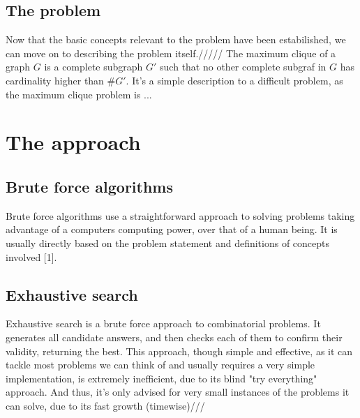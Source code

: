 \documentclass[...]{revdetua}
\begin{document}
\subsection{The problem}
Now that the basic concepts relevant to the problem have been estabilished, we can move on to describing the problem itself./////
The maximum clique of a graph $G$ is a complete subgraph $G'$ such that no other complete subgraf in 
$G$ has cardinality higher than $\#G'$.
It's a simple description to a difficult problem, as the maximum clique problem is ...
\section{The approach}
\subsection{Brute force algorithms}
Brute force algorithms use a straightforward approach to solving problems taking advantage of a computers computing power, over that of a human being.
It is usually directly based on the problem statement and definitions of concepts involved [1]. 
\subsection{Exhaustive search}
Exhaustive search is a brute force approach to combinatorial problems.
It generates all candidate answers, and then checks each of them to confirm their validity, returning the best.
This approach, though simple and effective, as it can tackle most problems we can think of and usually requires a very simple implementation, is extremely inefficient, due to its blind "try everything" approach. And thus, it's only advised for very small instances of the problems it can solve, due to its fast growth (timewise)///
\end{document}
